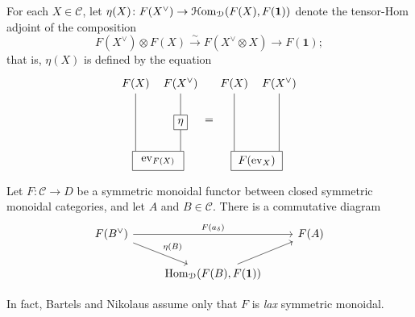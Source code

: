 \documentclass[english]{article}
\numberwithin{equation}{section}
\begin{document}
\begin{defn}
  For each $X\in\mathcal C$, let $\eta (X)\colon F(X^\vee )\to\operatorname{\mathcal{H}om}_{\mathcal D}(F(X),F(\mathbf 1))$ denote the tensor-Hom adjoint of the composition
  $$
  F(X^\vee)\otimes F(X)\xrightarrow\sim F(X^\vee\otimes X)\to F(\mathbf 1);
  $$
  that is, $\eta (X)$ is defined by the equation
  \begin{equation}
    \label{eq:eta-defn}
    \begin{tikzpicture}[baseline=(current bounding box.center)]
  \node (X) at (-0.7,3) {$F(X)$};
  \node (Xvee) at (0.7,3) {$F(X^\vee)$};

  \node[rectangle, draw,minimum width=0.4cm, minimum height=0.4cm] (etabox) at (0.7,1.8){$\eta$};

  \node[rectangle, draw, minimum width=1.6cm, minimum height=0.6cm] 
  (evFbox) at (0,0.6) {$\evalu_{F(X)}$};

  \draw (X) to (evFbox.north -| -0.7,2.5);
  \draw (Xvee) to (etabox.north);
  \draw (etabox.south) to (evFbox.north -| 0.7,2.5);
\end{tikzpicture}
=
\begin{tikzpicture}[baseline=(current bounding box.center)]
  \node (X) at (-0.7,3) {$F(X)$};
  \node (Xvee) at (0.7,3) {$F(X^\vee)$};

  \node[rectangle, draw, minimum width=1.6cm, minimum height=0.6cm] 
  (evFbox) at (0,0.6) {$F(\evalu_{X})$};

  \draw (X) to (evFbox.north -| -0.7,0);
  \draw (Xvee) to (evFbox.north -| 0.7,0);
\end{tikzpicture}
\end{equation}
\end{defn}
\begin{prop}
  Let $F\colon\mathcal C\to D$ be a symmetric monoidal functor between closed symmetric monoidal categories, and let $A$ and $B\in\mathcal C$.  There is a commutative diagram
  $$
  \begin{tikzcd}
    F(B^\vee )\arrow[rr,"F(a_\delta )"] \arrow[rd,"\eta (B)"]&& F(A) \\
    & \operatorname{Hom}_{\mathcal D}(F(B),F(\mathbf 1))\arrow[ru]
  \end{tikzcd}
  $$
\end{prop}
In fact, Bartels and Nikolaus assume only that $F$ is {\em lax} symmetric monoidal. 
\end{document}
